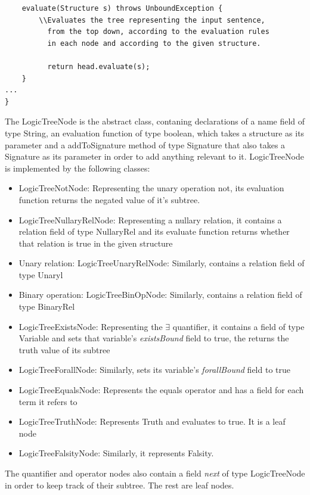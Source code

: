 \documentclass{article}
\begin{document}
\begin{enumerate}
\begin{verbatim}
    evaluate(Structure s) throws UnboundException {
        \\Evaluates the tree representing the input sentence, 
          from the top down, according to the evaluation rules 
          in each node and according to the given structure.

          return head.evaluate(s);
    }
...
}

\end{verbatim}

\noindent The LogicTreeNode is the abstract class, contaning declarations of a name field of type String, an evaluation function of type boolean, which takes a structure as its parameter and a addToSignature method of type Signature that also takes a Signature as its parameter in order to add anything relevant to it. LogicTreeNode is implemented by the following classes:

	\begin{itemize}
	\item LogicTreeNotNode: Representing the unary operation not, its evaluation function returns the negated value of it's subtree.
	\item LogicTreeNullaryRelNode: Representing a nullary relation, it contains a relation field of type NullaryRel and its evaluate function returns whether that relation is true in the given structure
	\item Unary relation: LogicTreeUnaryRelNode: Similarly, contains a relation field of type Unaryl
	\item Binary operation: LogicTreeBinOpNode: Similarly, contains a relation field of type BinaryRel
	\item LogicTreeExistsNode: Representing the $\exists$ quantifier, it contains a field of type Variable and sets that variable's \emph{existsBound} field to true, the returns the truth value of its subtree
	\item LogicTreeForallNode: Similarly, sets its variable's \emph{forallBound} field to true
	\item LogicTreeEqualsNode: Represents the equals operator and has a field for each term it refers to
	\item LogicTreeTruthNode: Represents Truth and evaluates to true. It is a leaf node
	\item LogicTreeFalsityNode: Similarly, it represents Falsity.
	\end{itemize}

\noindent The quantifier and operator nodes also contain a field \emph{next} of type LogicTreeNode in order to keep track of their subtree. The rest are leaf nodes.\\


\end{enumerate}
\end{document}
